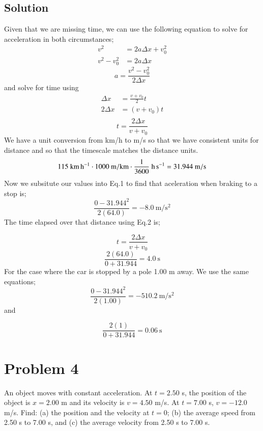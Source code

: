 \documentclass{article}
\begin{document}
\subsection*{Solution}
Given that we are missing time, we can use the following equation to solve for acceleration in both circumstances;
\begin{align*}
	v^2 &= 2a \Delta x + v_0^2 \\
	v^2  - v_0^2 &= 2a \Delta x
\end{align*}
\begin{equation}
	a = \frac{v^2  - v_0^2}{2\Delta x}
\end{equation}
and solve for time using
\begin{align*}
	\Delta x &= \frac{v + v_0}{2} t \\
	2 \Delta x &= \left(v + v_0 \right) t \\
\end{align*}
\begin{equation}
	t = \frac{2 \Delta x}{v + v_0}
\end{equation}
We have a unit conversion from km/h to m/s so that we have consistent units for distance and so that the timescale matches the distance units.
\[
	115\ \unit{\kilo\meter\per\hour} \cdot 1000\ \unit{{\meter\per\kilo\meter}} \cdot \frac{1}{3600}\ \unit{\hour\per\second} = 31.944\ \unit{{\meter\per\second}}
\]
Now we subsitute our values into Eq.1 to find that aceleration when braking to a stop is;
\[
	\frac{0 - 31.944^2}{2\left(64.0\right)} = -8.0\ \unit{\meter\per\second^2}
\]
The time elapsed over that distance using Eq.2 is;

\[
	t = \frac{2 \Delta x}{v + v_0}
\]
\[
	\frac{2 (64.0)}{0 + 31.944} = 4.0\ \unit{\second}
\]
For the case where the car is stopped by a pole 1.00 m away. We use the same equations;
\[
	\frac{0-31.944^2}{2(1.00)} = -510.2\ \unit{\meter\per\second^2}
\]
and

\[
	\frac{2(1)}{0 + 31.944} = 0.06\ \unit{\second}
\]

\section*{Problem 4}
An object moves with constant acceleration. At $t = 2.50$ s, the position of the object is
$x = 2.00$ m and its velocity is $v = 4.50$ m/s. At $t = 7.00$ s, $v = -12.0$ m/s. Find: (a) the
position and the velocity at $t = 0$; (b) the average speed from 2.50 s to 7.00 s, and (c) the
average velocity from 2.50 s to 7.00 s.
\end{document}
